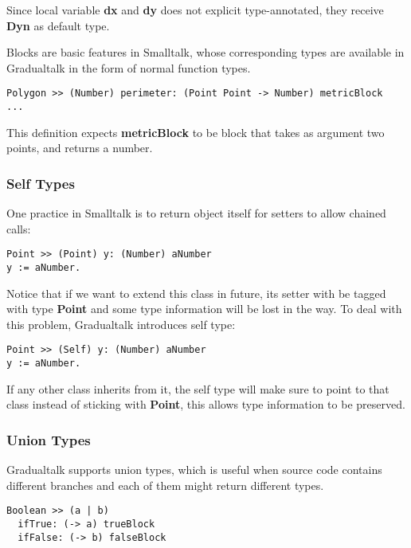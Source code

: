 Since local variable \textbf{dx} and \textbf{dy} does not explicit type-annotated,
they receive \textbf{Dyn} as default type.

Blocks are basic features in Smalltalk,
whose corresponding types are available in Gradualtalk in the form of normal function types.

\begin{verbatim}
Polygon >> (Number) perimeter: (Point Point -> Number) metricBlock
...
\end{verbatim}

This definition expects \textbf{metricBlock} to be block
that takes as argument two points, and returns a number.

\subsubsection{Self Types}

One practice in Smalltalk is to return object itself for setters
to allow chained calls:

\begin{verbatim}
Point >> (Point) y: (Number) aNumber
y := aNumber.
\end{verbatim}

Notice that if we want to extend this class in future,
its setter with be tagged with type \textbf{Point} and some
type information will be lost in the way.
To deal with this problem, Gradualtalk introduces self type:

\begin{verbatim}
Point >> (Self) y: (Number) aNumber
y := aNumber.
\end{verbatim}

If any other class inherits from it, the self type will make sure
to point to that class instead of sticking with \textbf{Point},
this allows type information to be preserved.

\subsubsection{Union Types}

Gradualtalk supports union types, which is useful when
source code contains different branches and each of them might return different types.

\begin{verbatim}
Boolean >> (a | b)
  ifTrue: (-> a) trueBlock
  ifFalse: (-> b) falseBlock
\end{verbatim}

